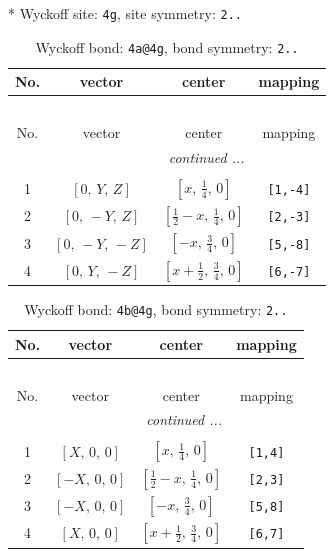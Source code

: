 \documentclass[fleqn,8pt]{jsarticle}
\begin{document}
* Wyckoff site: {\tt 4g}, site symmetry: {\tt 2..}
\renewcommand{\arraystretch}{1.2}
\begin{longtable}{cccc}
\caption{Wyckoff bond: {\tt 4a@4g}, bond symmetry: {\tt 2..}}
 \\
 \hline \hline
No. & vector & center & mapping \\ \hline \endfirsthead

\multicolumn{3}{l}{\tablename\ \thetable{}} \\
 \hline \hline
No. & vector & center & mapping \\ \hline \endhead

 \hline \hline
\multicolumn{3}{r}{\footnotesize\it continued ...} \\ \endfoot

 \hline \hline
\multicolumn{3}{r}{} \\ \endlastfoot

1 & $\left[ 0,\, Y,\, Z \right]$ & $\left[ x,\, \frac{1}{4},\, 0 \right]$ & {\tt [1,-4]} \\ \hline
2 & $\left[ 0,\, - Y,\, Z \right]$ & $\left[ \frac{1}{2} - x,\, \frac{1}{4},\, 0 \right]$ & {\tt [2,-3]} \\ \hline
3 & $\left[ 0,\, - Y,\, - Z \right]$ & $\left[ - x,\, \frac{3}{4},\, 0 \right]$ & {\tt [5,-8]} \\ \hline
4 & $\left[ 0,\, Y,\, - Z \right]$ & $\left[ x + \frac{1}{2},\, \frac{3}{4},\, 0 \right]$ & {\tt [6,-7]} \\
\end{longtable}
\renewcommand{\arraystretch}{1.2}
\begin{longtable}{cccc}
\caption{Wyckoff bond: {\tt 4b@4g}, bond symmetry: {\tt 2..}}
 \\
 \hline \hline
No. & vector & center & mapping \\ \hline \endfirsthead

\multicolumn{3}{l}{\tablename\ \thetable{}} \\
 \hline \hline
No. & vector & center & mapping \\ \hline \endhead

 \hline \hline
\multicolumn{3}{r}{\footnotesize\it continued ...} \\ \endfoot

 \hline \hline
\multicolumn{3}{r}{} \\ \endlastfoot

1 & $\left[ X,\, 0,\, 0 \right]$ & $\left[ x,\, \frac{1}{4},\, 0 \right]$ & {\tt [1,4]} \\ \hline
2 & $\left[ - X,\, 0,\, 0 \right]$ & $\left[ \frac{1}{2} - x,\, \frac{1}{4},\, 0 \right]$ & {\tt [2,3]} \\ \hline
3 & $\left[ - X,\, 0,\, 0 \right]$ & $\left[ - x,\, \frac{3}{4},\, 0 \right]$ & {\tt [5,8]} \\ \hline
4 & $\left[ X,\, 0,\, 0 \right]$ & $\left[ x + \frac{1}{2},\, \frac{3}{4},\, 0 \right]$ & {\tt [6,7]} \\
\end{longtable}
\end{document}
